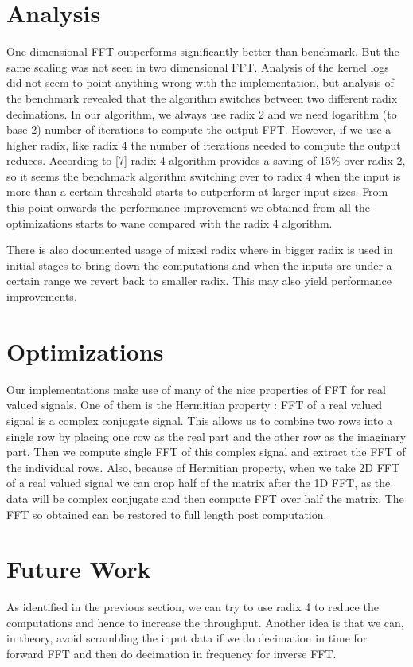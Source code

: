 \documentclass[sigconf]{acmart}
\begin{document}
\section{Analysis}
One dimensional FFT outperforms significantly better than benchmark. But the same scaling was not seen in two dimensional FFT. Analysis of the kernel logs did not seem to point anything wrong with the implementation, but analysis of the benchmark revealed that the algorithm switches between two different radix decimations. In our algorithm, we always use radix 2 and we need logarithm (to base 2) number of iterations to compute the output FFT. However, if we use a higher radix, like radix 4 the number of iterations needed to compute the output reduces. According to [7] radix 4 algorithm provides a saving of 15\% over radix 2, so it seems the benchmark algorithm switching over to radix 4 when the input is more than a certain threshold starts to outperform at larger input sizes. From this point onwards the performance improvement we obtained from all the optimizations starts to wane compared with the radix 4 algorithm. 

There is also documented usage of mixed radix where in bigger radix is used in initial stages to bring down the computations and when the inputs are under a certain range we revert back to smaller radix. This may also yield performance improvements.


\section{Optimizations}
Our implementations make use of many of the nice properties of FFT for real valued signals. One of them is the Hermitian property : FFT of a real valued signal is a complex conjugate signal. This allows us to combine two rows into a single row by placing one row as the real part and the other row as the imaginary part. Then we compute single FFT of this complex signal and extract the FFT of the individual rows. Also, because of Hermitian property, when we take 2D FFT of a real valued signal we can crop half of the matrix after the 1D FFT, as the data will be complex conjugate and then compute FFT over half the matrix. The FFT so obtained can be restored to full length post computation.

\section{Future Work}
As identified in the previous section, we can try to use radix 4 to reduce the computations and hence to increase the throughput. Another idea is that we can, in theory, avoid scrambling the input data if we do decimation in time for forward FFT and then do decimation in frequency for inverse FFT.
\end{document}

